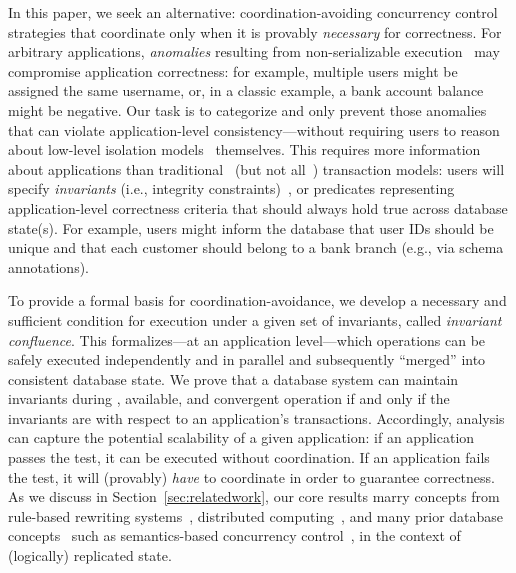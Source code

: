 
In this paper, we seek an alternative: coordination-avoiding
concurrency control strategies that coordinate only when it is
provably \textit{necessary} for correctness. For arbitrary
applications, \textit{anomalies} resulting from non-serializable
execution~\cite{adya-isolation} may compromise application
correctness: for example, multiple users might be assigned the same
username, or, in a classic example, a bank account balance might be
negative. Our task is to categorize and only prevent those anomalies
that can violate application-level consistency---without requiring
users to reason about low-level isolation models~\cite{hat-vldb}
themselves. This requires more information about applications than
traditional~\cite{bernstein-book,gray-virtues} (but not
all~\cite{eswaran-consistency,korth-serializability,decomp-semantics,garciamolina-semantics,activedb-book,ic-survey,ic-survey-two})
transaction models: users will specify \textit{invariants} (i.e.,
integrity constraints)~\cite{traiger-tods}, or predicates representing
application-level correctness criteria that should always hold true
across database state(s). For example, users might inform the database
that user IDs should be unique and that each customer should belong to
a bank branch (e.g., via schema annotations).

To provide a formal basis for coordination-avoidance, we develop a
necessary and sufficient condition for \cfree execution under a given
set of invariants, called \textit{invariant confluence}. This
\iconfluence formalizes---at an application level---which operations
can be safely executed independently and in parallel and subsequently
``merged'' into consistent database state. We prove that a database
system can maintain invariants during \cfree, available, and
convergent operation if and only if the invariants are \iconfluent
with respect to an application's transactions. Accordingly,
\iconfluence analysis can capture the potential scalability of a given
application: if an application passes the \iconfluence test, it can be
executed without coordination. If an application fails the test, it
will (provably) \textit{have} to coordinate in order to guarantee
correctness. As we discuss in Section~\ref{sec:relatedwork}, our core
results marry concepts from rule-based rewriting
systems~\cite{obs-confluence,termrewriting}, distributed
computing~\cite{herlihy-apologizing,gilbert-cap,hat-vldb}, and many
prior database concepts~\cite{activedb-book,ic-survey,ic-survey-two}
such as semantics-based concurrency
control~\cite{sdd1,decomp-semantics,badrinath-semantics,garciamolina-semantics,korth-serializability,atomictransactions,weihl-thesis},
in the context of (logically) replicated state.

